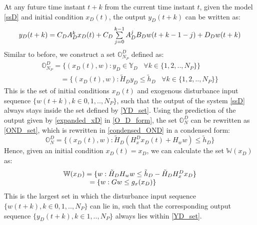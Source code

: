 \documentclass[letterpaper, 10 pt, conference]{ieeeconf}  %
\begin{document}
At any future time instant $t+k$ from the current time instant $t$, given the model \eqref{ssD} and initial condition $x_D(t)$, the output $y_D(t+k)$ can be written as:
\begin{equation}
\small
\begin{matrix}
y_D(t+k)=C_DA_D^{k}x_D(t)+ C_D\sum\limits_{j=0}^{k-1}A_D^jB_Dw(t+k-1-j)+D_Dw(t+k) \\
\end{matrix}
\label{expanded_xD}
\end{equation}
Similar to before, we construct a set $\mathbb{O}^D_{N_P}$ defined as:
  \begin{equation}
  \begin{matrix}
  \mathbb{O}^D_{N_P} = \{(x_D(t),w):y_D\in \mathbb{Y}_D \hspace{10pt} \forall k \in \{1,2,..,N_P\} \}  \\
    \hspace{32pt} = \{(x_D(t),w):\tilde{H}_Dy_D \leq \tilde{h}_D \hspace{10pt} \forall k \in \{1,2,..,N_P\} \} 
  \end{matrix}
  \label{O_D_form}
  \end{equation}
  This is the set of initial conditions $x_D(t)$ and exogenous disturbance input sequence $\{w(t+k),k \in 0, 1, .., N_P\}$, such that the output of the system \eqref{ssD} always stays inside the set defined by \eqref{YD_set}. Using the prediction of the output given by \eqref{expanded_xD} in \eqref{O_D_form}, 
  the set $\mathbb{O}_N^D$ can be rewritten as \eqref{OND_set}, which is rewritten in \eqref{condensed_OND} in a condensed form:
  \begin{equation}
  \mathbb{O}_N^D=\{(x_D(t),w): \tilde{H}_D(H_x^Dx_D(t)+H_ww) \leq \tilde{h}_D\}
  \label{condensed_OND}
  \end{equation}
  Hence, given an initial condition $x_D(t)=x_D$, we can calculate the set $\mathbb{W}(x_D)$ as:
  \begin{equation}
  \begin{matrix}
  \mathbb{W}(x_D) = \{w: \tilde{H}_DH_ww \leq \tilde{h}_D-\tilde{H}_DH_x^Dx_D\} \\
  \hspace{-20pt}
   = \{w: Gw \leq g_x(x_D)\}
   \end{matrix}
   \label{w_xd_set}
  \end{equation}
  This is the largest set in which the disturbance input sequence $\{w(t+k),k \in 0,1,..,N_P\}$ can lie in, such that the corresponding output sequence $\{y_D(t+k),k \in 1,..,N_P\}$ always lies within \eqref{YD_set}. \\
\end{document}
